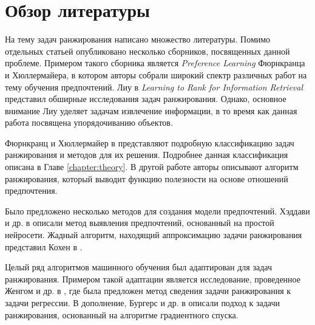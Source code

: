 \chapter{Обзор литературы}
\label{chapter:literature}

На тему задач ранжирования написано множество литературы. Помимо отдельных статьей опубликовано несколько сборников, посвященных данной проблеме. Примером такого сборника является \textit{Preference Learning} \cite{plbook:2010} Фюрнкранца и Хюллермайера, в котором авторы собрали широкий спектр различных работ на тему обучения предпочтений. Лиу в \textit{Learning to Rank for Information Retrieval} \cite{Liu:2011} представил обширные исследования задач ранжирования. Однако, основное внимание Лиу уделяет задачам извлечение информации, в то время как данная работа посвящена упорядочиванию объектов.

Фюрнкранц и Хюллермайер в \cite{plbook:Introduction:2010} представляют подробную классификацию задач ранжирования и методов для их решения. Подробнее данная классификация описана в Главе \ref{chapter:theory}. В другой работе \cite{Furnkranz:2003} авторы описывают алгоритм ранжирования, который выводит функцию полезности на основе отношений предпочтения.

Было предложено несколько методов для создания модели предпочтений. Хэддави и др. в \cite{Haddawy:2003} описали метод выявления предпочтений, основанный на простой нейросети. Жадный алгоритм, находящий аппроксимацию задачи ранжирования представил Кохен в \cite{Cohen:1999}.

Целый ряд алгоритмов машинного обучения был адаптирован для задач ранжирования. Примером такой адаптации является исследование, проведенное Женгом и др. в \cite{Zheng:2007}, где была предложен метод сведения задачи ранжирования к задачи регрессии. В дополнение, Бургерс и др. в \cite{Burges:2005} описали подход к задачи ранжирования, основанный на алгоритме градиентного спуска.